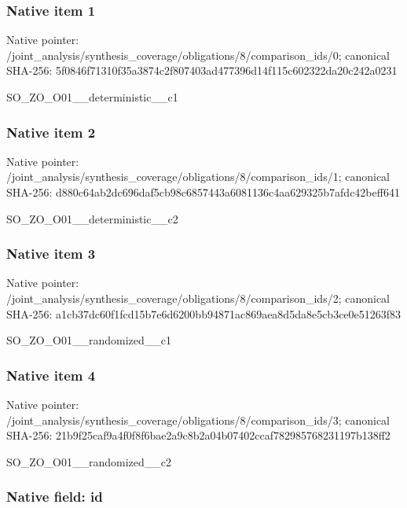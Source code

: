 \documentclass[10pt,a4paper]{article}
\begin{document}
\subsubsection{Native item 1}


Native pointer: /joint\_analysis/synthesi\allowbreak{}s\_coverage/obligations/8\allowbreak{}/comparison\_ids/0; canonical SHA-256: 5f0846f71310f35a3874c2f8\allowbreak{}07403ad477396d14f115c602\allowbreak{}322da20c242a0231


SO\_ZO\_O01\_\_deterministic\_\_c1


\subsubsection{Native item 2}


Native pointer: /joint\_analysis/synthesi\allowbreak{}s\_coverage/obligations/8\allowbreak{}/comparison\_ids/1; canonical SHA-256: d880c64ab2dc696daf5cb98c\allowbreak{}6857443a6081136c4aa62932\allowbreak{}5b7afdc42beff641


SO\_ZO\_O01\_\_deterministic\_\_c2


\subsubsection{Native item 3}


Native pointer: /joint\_analysis/synthesi\allowbreak{}s\_coverage/obligations/8\allowbreak{}/comparison\_ids/2; canonical SHA-256: a1cb37dc60f1fcd15b7e6d62\allowbreak{}00bb94871ac869aea8d5da8e\allowbreak{}5cb3ce0e51263f83


SO\_ZO\_O01\_\_randomized\_\_c1


\subsubsection{Native item 4}


Native pointer: /joint\_analysis/synthesi\allowbreak{}s\_coverage/obligations/8\allowbreak{}/comparison\_ids/3; canonical SHA-256: 21b9f25caf9a4f0f8f6bae2a\allowbreak{}9c8b2a04b07402ccaf782985\allowbreak{}768231197b138ff2


SO\_ZO\_O01\_\_randomized\_\_c2


\subsubsection{Native field: id}
\end{document}
